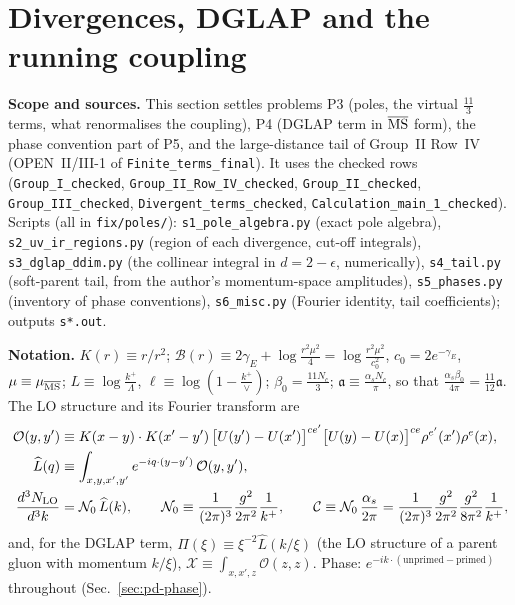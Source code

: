 \section{Divergences, DGLAP and the running coupling}
\label{sec:poles-dglap}

\noindent\textbf{Scope and sources.} This section settles problems P3 (poles, the virtual $\frac{11}{3}$ terms, what renormalises the coupling), P4 (DGLAP term in $\overline{\rm MS}$ form), the phase convention part of P5, and the large-distance tail of Group~II Row~IV (OPEN~II/III-1 of \texttt{Finite\_terms\_final}). It uses the checked rows (\texttt{Group\_I\_checked}, \texttt{Group\_II\_Row\_IV\_checked}, \texttt{Group\_II\_checked}, \texttt{Group\_III\_checked}, \texttt{Divergent\_terms\_checked}, \texttt{Calculation\_main\_1\_checked}). Scripts (all in \texttt{fix/poles/}): \texttt{s1\_pole\_algebra.py} (exact pole algebra), \texttt{s2\_uv\_ir\_regions.py} (region of each divergence, cut-off integrals), \texttt{s3\_dglap\_ddim.py} (the collinear integral in $d=2-\epsilon$, numerically), \texttt{s4\_tail.py} (soft-parent tail, from the author's momentum-space amplitudes), \texttt{s5\_phases.py} (inventory of phase conventions), \texttt{s6\_misc.py} (Fourier identity, tail coefficients); outputs \texttt{s*.out}.

\medskip
\noindent\textbf{Notation.} $K(r)\equiv r/r^{2}$; $\mathcal{B}(r)\equiv2\gamma_{E}+\log\frac{r^{2}\mu^{2}}{4}=\log\frac{r^{2}\mu^{2}}{c_{0}^{2}}$, $c_{0}=2e^{-\gamma_{E}}$, $\mu\equiv\mu_{\overline{\rm MS}}$; $L\equiv\log\frac{k^{+}}{\Lambda}$, $\ell\equiv\log(1-\frac{k^{+}}{\vee})$; $\beta_{0}=\frac{11N_{c}}{3}$; $\mathfrak{a}\equiv\frac{\alpha_{s}N_{c}}{\pi}$, so that $\frac{\alpha_{s}\beta_{0}}{4\pi}=\frac{11}{12}\mathfrak{a}$. The LO structure and its Fourier transform are
\begin{align}
\mathcal{O}(y,y')&\equiv K(x-y)\cdot K(x'-y')\,\big[U(y')-U(x')\big]^{ce'}\big[U(y)-U(x)\big]^{ce}\rho^{e'}(x')\rho^{e}(x),\notag\\
\widehat{L}(q)&\equiv\int_{x,y,x',y'}e^{-iq\cdot(y-y')}\,\mathcal{O}(y,y'),\notag\\
\frac{d^{3}N_{\rm LO}}{d^{3}k}&=\mathcal{N}_{0}\,\widehat{L}(k),\qquad \mathcal{N}_{0}\equiv\frac{1}{(2\pi)^{3}}\frac{g^{2}}{2\pi^{2}}\frac{1}{k^{+}},\qquad
\mathcal{C}\equiv\mathcal{N}_{0}\,\frac{\alpha_{s}}{2\pi}=\frac{1}{(2\pi)^{3}}\frac{g^{2}}{2\pi^{2}}\frac{g^{2}}{8\pi^{2}}\frac{1}{k^{+}},
\label{eq:pd-not}
\end{align}
and, for the DGLAP term, $\Pi(\xi)\equiv\xi^{-2}\widehat{L}(k/\xi)$ (the LO structure of a parent gluon with momentum $k/\xi$), $\mathcal{X}\equiv\int_{x,x',z}\mathcal{O}(z,z)$. Phase: $e^{-ik\cdot(\text{unprimed}-\text{primed})}$ throughout (Sec.~\ref{sec:pd-phase}).

